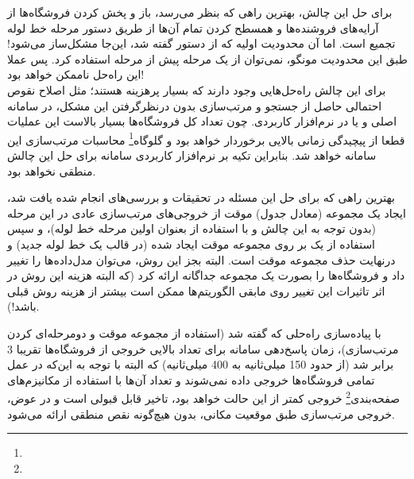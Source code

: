 برای حل این چالش، بهترین راهی که بنظر می‌رسد، باز و پخش کردن فروشگاه‌ها از آرایه‌های فروشنده‌ها و همسطح کردن تمام آن‌ها از طریق دستور مرحله خط لوله تجمیع  است. اما آن محدودیت اولیه که از دستور  گفته شد، این‌جا مشکل‌ساز می‌شود! طبق این محدودیت مونگو،‌ نمی‌توان از یک مرحله  پیش از مرحله  استفاده کرد. پس عملا این راه‌حل ناممکن خواهد بود!\cite{mongo:geostack}\\

برای این چالش راه‌حل‌هایی وجود دارند که بسیار پرهزینه هستند؛ مثل اصلاح نقوص احتمالی حاصل از جستجو و مرتب‌سازی بدون درنظرگرفتن این مشکل، در سامانه اصلی و یا در نرم‌افزار کاربردی. چون تعداد کل فروشگاه‌ها بسیار بالاست این عملیات قطعا از پیچیدگی زمانی بالایی برخوردار خواهد بود و گلوگاه\footnote{} محاسبات مرتب‌سازی این سامانه خواهد شد. بنابراین تکیه بر نرم‌افزار کاربردی سامانه برای حل این چالش منطقی نخواهد بود.

بهترین راهی که برای حل این مسئله در تحقیقات و بررسی‌های انجام شده یافت شد، ایجاد یک مجموعه (معادل جدول) موقت از خروجی‌های مرتب‌سازی عادی در این مرحله (بدون توجه به این چالش و با استفاده از  بعنوان اولین مرحله خط لوله)، و سپس استفاده از یک  بر روی مجموعه موقت ایجاد شده (در قالب یک خط لوله جدید) و درنهایت حذف مجموعه موقت است. البته بجز این روش، می‌توان مدل‌داده‌ها را تغییر داد و فروشگاه‌ها را بصورت یک مجموعه جداگانه ارائه کرد (که البته هزینه این روش در اثر تاثیرات این تغییر روی مابقی الگوریتم‌ها ممکن است بیشتر از هزینه روش قبلی باشد!).

با پیاده‌سازی راه‌حلی که گفته شد (استفاده از مجموعه موقت و دومرحله‌ای کردن مرتب‌سازی)، زمان پاسخ‌دهی سامانه برای تعداد بالایی خروجی از فروشگاه‌ها تقریبا 3 برابر شد (از حدود 150 میلی‌ثانیه به 400 میلی‌ثانیه) که البته با توجه به این‌که در عمل تمامی فروشگاه‌ها خروجی داده نمی‌شوند و تعداد آن‌ها با استفاده از مکانیزم‌های صفحه‌بندی\footnote{} خروجی کمتر از این حالت خواهد بود، تاخیر قابل قبولی است و در عوض، خروجی مرتب‌سازی طبق موقعیت مکانی، بدون هیچ‌گونه نقص منطقی ارائه می‌شود.

